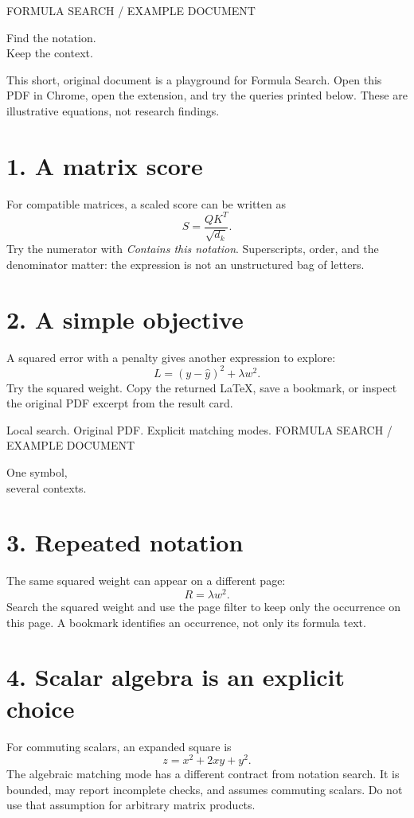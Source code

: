 \documentclass[11pt]{article}
\begin{document}
\pagestyle{plain}
{\color{accent}\small FORMULA SEARCH / EXAMPLE DOCUMENT}

{\color{ink}\Huge Find the notation.\\[3pt] Keep the context.}

This short, original document is a playground for Formula Search. Open this PDF
in Chrome, open the extension, and try the queries printed below. These are
illustrative equations, not research findings.

\section*{1. A matrix score}
For compatible matrices, a scaled score can be written as
\begin{equation}
 S = \frac{QK^T}{\sqrt{d_k}}.
\end{equation}
Try the numerator with \emph{Contains this notation}. Superscripts, order,
and the denominator matter: the expression is not an unstructured bag of letters.

\section*{2. A simple objective}
A squared error with a penalty gives another expression to explore:
\begin{equation}
 L = (y-\hat{y})^2 + \lambda w^2.
\end{equation}
Try the squared weight. Copy the returned LaTeX, save a bookmark, or inspect
the original PDF excerpt from the result card.

\vfill
{\small\color{accent} Local search. Original PDF. Explicit matching modes.}
\newpage
{\color{accent}\small FORMULA SEARCH / EXAMPLE DOCUMENT}

{\color{ink}\Huge One symbol,\\[3pt] several contexts.}

\section*{3. Repeated notation}
The same squared weight can appear on a different page:
\begin{equation}
 R = \lambda w^2.
\end{equation}
Search the squared weight and use the page filter to keep only the occurrence
on this page. A bookmark identifies an occurrence, not only its formula text.

\section*{4. Scalar algebra is an explicit choice}
For commuting scalars, an expanded square is
\begin{equation}
 z = x^2 + 2xy + y^2.
\end{equation}
The algebraic matching mode has a different contract from notation search.
It is bounded, may report incomplete checks, and assumes commuting scalars.
Do not use that assumption for arbitrary matrix products.
\end{document}
